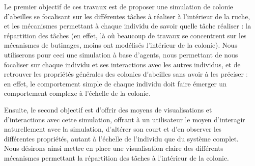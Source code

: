 	Le premier objectif de ces travaux est de proposer une simulation de colonie d'abeilles se focalisant sur les différentes tâches à réaliser à l'intérieur de la ruche, et les mécanismes permettant à chaque individu de savoir quelle tâche réaliser : la répartition des tâches (en effet, là où beaucoup de travaux se concentrent sur les mécanismes de butinages, moins ont modélisés l'intérieur de la colonie). Nous utiliserons pour ceci une simulation à base d'agents, nous permettant de nous focaliser sur chaque individu et ses interactions avec les autres individus, et de retrouver les propriétés générales des colonies d'abeilles sans avoir à les préciser : en effet, le comportement simple de chaque individu doit faire émerger un comportement complexe à l'échelle de la colonie. 
	
	Ensuite, le second objectif est d'offrir des moyens de visualisations et d'interactions avec cette simulation, offrant à un utilisateur le moyen d'interagir naturellement avec la simulation, d'altérer son court et d'en observer les différentes propriétés, autant à l'échelle de l'individu que du système complet. Nous désirons ainsi mettre en place une visualisation claire des différents mécanismes permettant la répartition des tâches à l'intérieur de la colonie.
	
